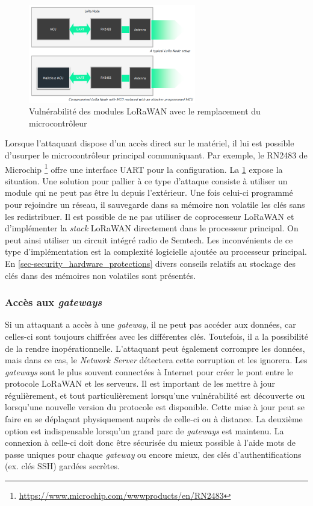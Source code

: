 \begin{figure}[ht!]
    \centering
    \includegraphics[width=0.65\textwidth]{Figures/Security/LoRaWAN/hardware_attack.png}
    \caption{Vulnérabilité des modules LoRaWAN avec le remplacement du microcontrôleur}
    \label{fig-hardware_attack}
\end{figure}

Lorsque l'attaquant dispose d'un accès direct sur le matériel, il lui est possible d'usurper le microcontrôleur principal communiquant. Par exemple, le RN2483 de Microchip \footnote{\url{https://www.microchip.com/wwwproducts/en/RN2483}} offre une interface UART pour la configuration. La \cref{fig-hardware_attack} expose la situation. Une solution pour pallier à ce type d'attaque consiste à utiliser un module qui ne peut pas être lu depuis l'extérieur. Une fois celui-ci programmé pour rejoindre un réseau, il sauvegarde dans sa mémoire non volatile les clés sans les redistribuer.
Il est possible de ne pas utiliser de coprocesseur LoRaWAN et d'implémenter la \textit{stack} LoRaWAN directement dans le processeur principal. On peut ainsi utiliser un circuit intégré radio de Semtech. Les inconvénients de ce type d'implémentation est la complexité logicielle ajoutée au processeur principal. En \cref{sec-security_hardware_protections} divers conseils relatifs au stockage des clés dans des mémoires non volatiles sont présentés.


\subsubsection{Accès aux \textit{gateways}}

Si un attaquant a accès à une \textit{gateway}, il ne peut pas accéder aux données, car celles-ci sont toujours chiffrées avec les différentes clés. Toutefois, il a la possibilité de la rendre inopérationnelle. L'attaquant peut également corrompre les données, mais dans ce cas, le \textit{Network Server} détectera cette corruption et les ignorera.
Les \textit{gateways} sont le plus souvent connectées à Internet pour créer le pont entre le protocole LoRaWAN et les serveurs. Il est important de les mettre à jour régulièrement, et tout particulièrement lorsqu’une vulnérabilité est découverte ou lorsqu'une nouvelle version du protocole est disponible. Cette mise à jour peut se faire en se déplaçant physiquement auprès de celle-ci ou à distance. La deuxième option est indispensable lorsqu'un grand parc de \textit{gateways} est maintenu. La connexion à celle-ci doit donc être sécurisée du mieux possible à l'aide mots de passe uniques pour chaque \textit{gateway} ou encore mieux, des clés d'authentifications (ex. clés SSH) gardées secrètes. 

